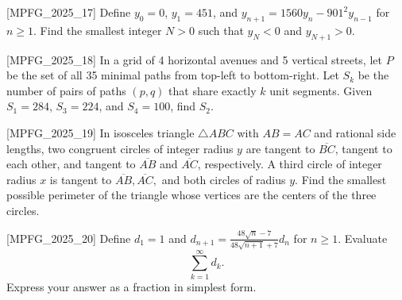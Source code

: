 [MPFG_2025_17]
Define $y_0 = 0$, $y_1 = 451$, and $y_{n+1} = 1560y_n - 901^2 y_{n-1}$ for $n \ge 1$. Find the smallest integer $N > 0$ such that $y_N < 0$ and $y_{N+1} > 0$.

[MPFG_2025_18]
In a grid of 4 horizontal avenues and 5 vertical streets, let $P$ be the set of all 35 minimal paths from top-left to bottom-right. Let $S_k$ be the number of pairs of paths $(p, q)$ that share exactly $k$ unit segments. Given $S_1 = 284$, $S_3 = 224$, and $S_4 = 100$, find $S_2$.

[MPFG_2025_19]
In isosceles triangle $\triangle ABC$ with $AB=AC$ and rational side lengths, two congruent circles of integer radius $y$ are tangent to $\overline{BC}$, tangent to each other, and tangent to $\overline{AB}$ and $\overline{AC}$, respectively. A third circle of integer radius $x$ is tangent to $\overline{AB}, \overline{AC},$ and both circles of radius $y$. Find the smallest possible perimeter of the triangle whose vertices are the centers of the three circles.

[MPFG_2025_20]
Define $d_1 = 1$ and $d_{n+1} = \frac{48\sqrt{n} - 7}{48\sqrt{n+1} + 7} d_n$ for $n \ge 1$. Evaluate
$$\sum_{k=1}^\infty d_k.$$
Express your answer as a fraction in simplest form.
